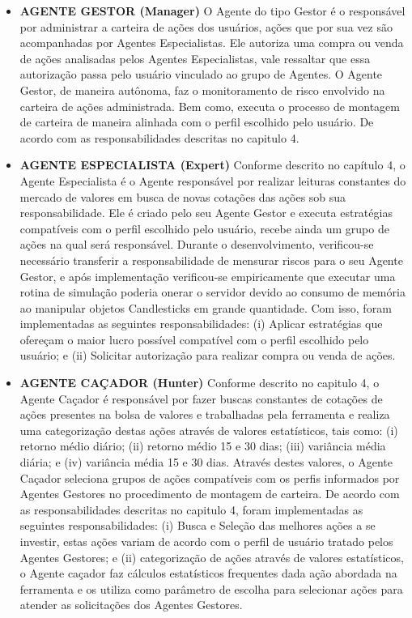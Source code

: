 \begin{itemize}
\item \textbf{AGENTE GESTOR (Manager)}\newline \newline
O Agente do tipo Gestor é o responsável por administrar a carteira de ações dos usuários, ações que por sua vez são acompanhadas por Agentes Especialistas. Ele autoriza uma compra ou venda de ações analisadas pelos Agentes Especialistas, vale ressaltar que essa autorização passa pelo usuário vinculado ao grupo de Agentes. O Agente Gestor, de maneira autônoma, faz o monitoramento de risco envolvido na carteira de ações administrada. Bem como, executa o processo de montagem de carteira de maneira alinhada com o perfil escolhido pelo usuário. De acordo com as responsabilidades descritas no capitulo 4.
\item \textbf{AGENTE ESPECIALISTA (Expert)}\newline \newline
Conforme descrito no capítulo 4, o Agente Especialista é o Agente responsável por realizar leituras constantes do mercado de valores em busca de novas cotações das ações sob sua responsabilidade. Ele é criado pelo seu Agente Gestor e executa estratégias compatíveis com o perfil escolhido pelo usuário, recebe ainda um grupo de ações na qual será responsável. Durante o desenvolvimento, verificou-se necessário transferir a responsabilidade de mensurar riscos para o seu Agente Gestor, e após implementação verificou-se empiricamente que executar uma rotina de simulação poderia onerar o servidor devido ao consumo de memória ao manipular objetos Candlesticks em grande quantidade. Com isso, foram implementadas as seguintes responsabilidades: (i) Aplicar estratégias que ofereçam o maior lucro possível compatível com o perfil escolhido pelo usuário; e (ii) Solicitar autorização para realizar compra ou venda de ações.

\item \textbf{AGENTE CAÇADOR (Hunter)}\newline \newline
Conforme descrito no capitulo 4, o Agente Caçador é responsável por fazer buscas constantes de cotações de ações presentes na bolsa de valores e trabalhadas pela ferramenta e realiza uma categorização destas ações através de valores estatísticos, tais como: (i) retorno médio diário; (ii) retorno médio 15 e 30 dias; (iii) variância média diária; e (iv) variância média 15 e 30 dias. Através destes valores, o Agente Caçador seleciona grupos de ações compatíveis com os perfis informados por Agentes Gestores no procedimento de montagem de carteira. De acordo com as responsabilidades descritas no capitulo 4, foram implementadas as seguintes responsabilidades: (i) Busca e Seleção das melhores ações a se investir, estas ações variam de acordo com o perfil de usuário tratado pelos Agentes Gestores; e (ii) categorização de ações através de valores estatísticos, o Agente caçador faz cálculos estatísticos frequentes dada ação abordada na ferramenta e os utiliza como parâmetro de escolha para selecionar ações para atender as solicitações dos Agentes Gestores.


\end{itemize}
